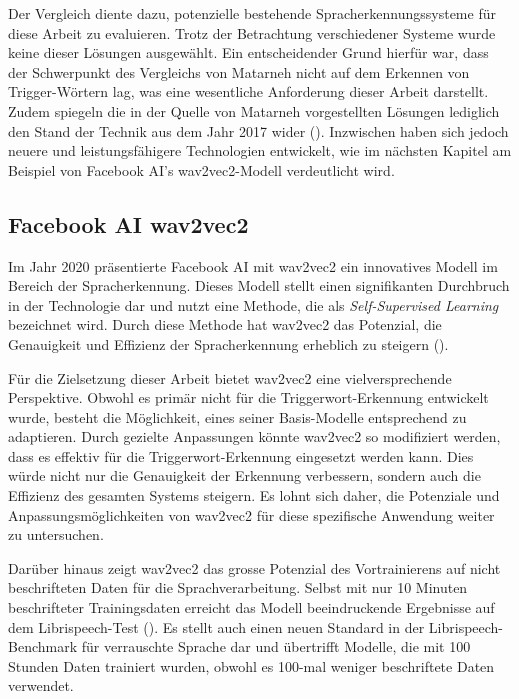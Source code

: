 \documentclass[11pt,a4paper]{article}
\begin{document}
\noindent
Der Vergleich diente dazu, potenzielle bestehende Spracherkennungssysteme für diese Arbeit zu 
evaluieren. Trotz der Betrachtung verschiedener Systeme wurde keine dieser Lösungen ausgewählt. Ein 
entscheidender Grund hierfür war, dass der Schwerpunkt des Vergleichs von Matarneh nicht auf dem 
Erkennen von Trigger-Wörtern lag, was eine wesentliche Anforderung dieser Arbeit darstellt. Zudem 
spiegeln die in der Quelle von Matarneh vorgestellten Lösungen lediglich den Stand der Technik aus 
dem Jahr 2017 wider (\cite{matarneh2017speechrecognition}). Inzwischen haben sich jedoch neuere und 
leistungsfähigere Technologien entwickelt, wie im nächsten Kapitel am Beispiel von Facebook AI's 
wav2vec2-Modell verdeutlicht wird.

\subsection{Facebook AI wav2vec2}

Im Jahr 2020 präsentierte Facebook AI mit wav2vec2 ein innovatives Modell im Bereich der 
Spracherkennung. Dieses Modell stellt einen signifikanten Durchbruch in der Technologie dar und 
nutzt eine Methode, die als \textit{Self-Supervised Learning} bezeichnet wird. Durch diese Methode 
hat wav2vec2 das Potenzial, die Genauigkeit und Effizienz der Spracherkennung erheblich zu steigern 
(\cite{baevski2020wav2vec}).

\noindent \newline
Für die Zielsetzung dieser Arbeit bietet wav2vec2 eine vielversprechende Perspektive. Obwohl es 
primär nicht für die Triggerwort-Erkennung entwickelt wurde, besteht die Möglichkeit, eines seiner 
Basis-Modelle entsprechend zu adaptieren. Durch gezielte Anpassungen könnte wav2vec2 so modifiziert 
werden, dass es effektiv für die Triggerwort-Erkennung eingesetzt werden kann. Dies würde nicht nur 
die Genauigkeit der Erkennung verbessern, sondern auch die Effizienz des gesamten Systems steigern. 
Es lohnt sich daher, die Potenziale und Anpassungsmöglichkeiten von wav2vec2 für diese spezifische 
Anwendung weiter zu untersuchen.

\noindent \newline
Darüber hinaus zeigt wav2vec2 das grosse Potenzial des Vortrainierens auf nicht beschrifteten 
Daten für die Sprachverarbeitung. Selbst mit nur 10 Minuten beschrifteter Trainingsdaten erreicht 
das Modell beeindruckende Ergebnisse auf dem Librispeech-Test (\cite{baevski2020wav2vec}). Es stellt 
auch einen neuen Standard in der Librispeech-Benchmark für verrauschte Sprache dar und übertrifft 
Modelle, die mit 100 Stunden Daten trainiert wurden, obwohl es 100-mal weniger beschriftete Daten 
verwendet.
\end{document}
